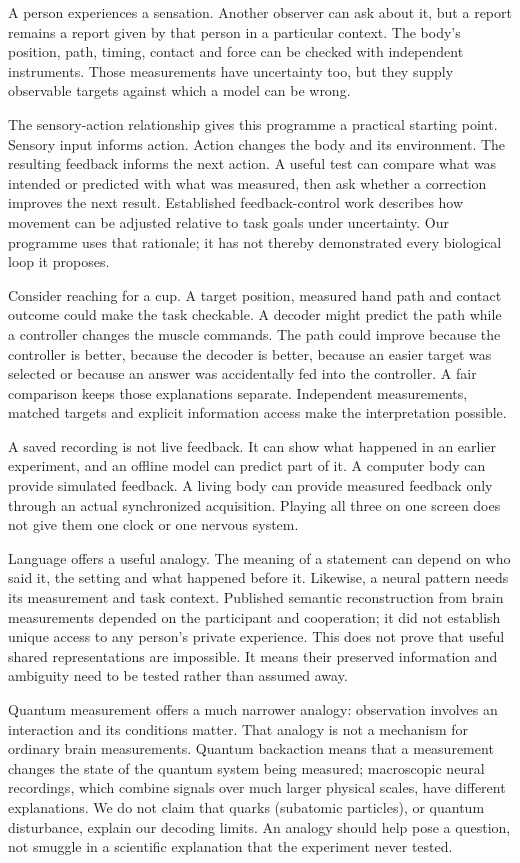A person experiences a sensation. Another observer can ask about it, but a
report remains a report given by that person in a particular context. The
body's position, path, timing, contact and force can be checked with independent
instruments. Those measurements have uncertainty too, but they supply observable
targets against which a model can be wrong.

The sensory-action relationship gives this programme a practical starting
point. Sensory input informs action. Action changes the body and its environment.
The resulting feedback informs the next action. A useful test can compare what
was intended or predicted with what was measured, then ask whether a correction
improves the next result. Established feedback-control work describes how
movement can be adjusted relative to task goals under uncertainty.\cite{todorov2002}
Our programme uses that rationale; it has not thereby demonstrated every
biological loop it proposes.

Consider reaching for a cup. A target position, measured hand path and contact
outcome could make the task checkable. A decoder might predict the path while a
controller changes the muscle commands. The path could improve because the
controller is better, because the decoder is better, because an easier target
was selected or because an answer was accidentally fed into the controller.
A fair comparison keeps those explanations separate. Independent measurements,
matched targets and explicit information access make the interpretation possible.

A saved recording is not live feedback. It can show what happened in an earlier
experiment, and an offline model can predict part of it. A computer body can
provide simulated feedback. A living body can provide measured feedback only
through an actual synchronized acquisition. Playing all three on one screen
does not give them one clock or one nervous system.

Language offers a useful analogy. The meaning of a statement can depend on
who said it, the setting and what happened before it. Likewise, a neural pattern
needs its measurement and task context. Published semantic reconstruction from
brain measurements depended on the participant and cooperation; it did not
establish unique access to any person's private experience.\cite{tang2023}
This does not prove that useful shared representations are impossible. It
means their preserved information and ambiguity need to be tested rather than
assumed away.

Quantum measurement offers a much narrower analogy: observation involves an
interaction and its conditions matter. That analogy is not a mechanism for
ordinary brain measurements. Quantum backaction means that a measurement changes the state of the quantum system being measured; macroscopic neural recordings, which combine signals over much larger physical
scales, have different explanations. We do not
claim that quarks (subatomic particles), or quantum disturbance, explain our decoding limits.\cite{quantum2012}
An analogy should help pose a question, not smuggle in a scientific explanation
that the experiment never tested.

